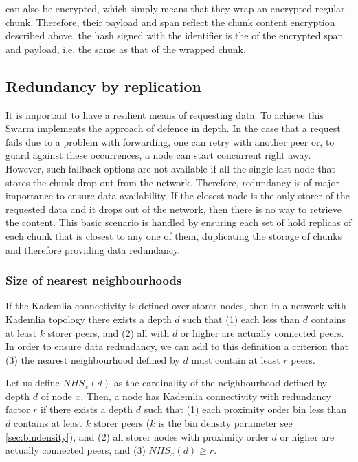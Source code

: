  can also be encrypted, which simply means that they wrap an encrypted regular chunk. Therefore, their payload and span reflect the chunk content encryption described above, the hash signed with the identifier is the  of the encrypted span and payload, i.e. the same as that of the wrapped chunk.

\subsection{Redundancy by replication\statusgreen}\label{sec:redundancy-by-local-replication}

It is important to have a resilient means of requesting data. To achieve this Swarm implements the approach of defence in depth. In the case that a request fails due to a problem with forwarding, one can retry with another peer or, to guard against these occurrences, a node can start concurrent  right away. However, such fallback options are not available if all the single last node that stores the chunk drop out from the network. Therefore, redundancy is of major importance to ensure data availability. If the closest node is the only storer of the requested data and it drops out of the network, then there is no way to retrieve the content. This basic scenario is handled by ensuring each set of  hold replicas of each chunk that is closest to any one of them, duplicating the storage of chunks and therefore providing data redundancy. 

\subsubsection{Size of nearest neighbourhoods}

If the Kademlia connectivity is defined over storer nodes, then in a network with Kademlia topology there exists a depth $d$ such that (1) each  less than $d$ contains at least $k$ storer peers, and (2) all  with  $d$ or higher are actually connected peers. In order to ensure data redundancy, we can add to this definition a criterion that (3) the nearest neighbourhood defined by $d$ must contain at least $r$ peers.

Let us define  $\mathit{NHS}_x(d)$  as the cardinality of the neighbourhood defined by depth $d$ of node $x$. 
Then, a node has Kademlia connectivity with redundancy factor $r$ if there exists a depth $d$ such that (1) each proximity order bin less than $d$ contains at least $k$ storer peers ($k$ is the bin density parameter see \ref{sec:bindensity}), and (2) all storer nodes with proximity order $d$ or higher are actually connected peers, and (3) $\mathit{NHS}_x(d)\geq r$.


